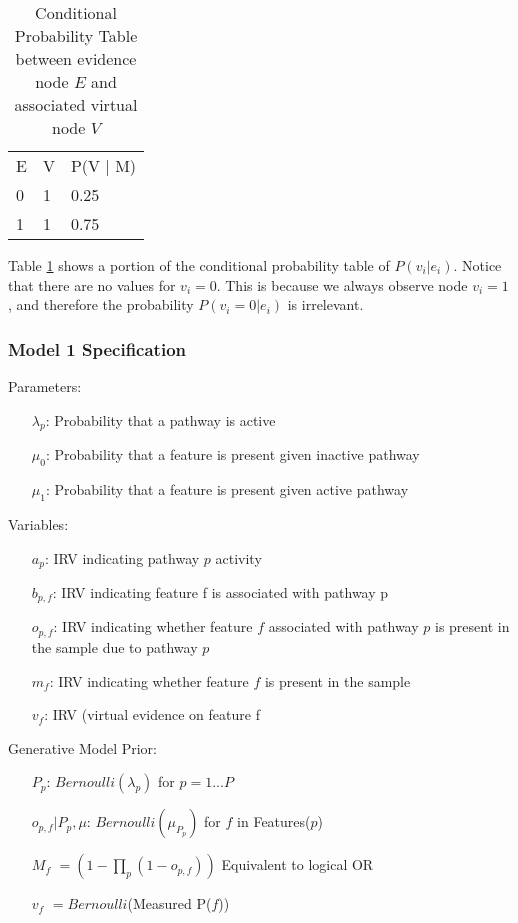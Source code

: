 \documentclass[11pt]{article}
\begin{document}
\begin{table}[]
\centering
\caption{Conditional Probability Table between evidence node $E$ and associated virtual node $V$}
\label{cpt}
\begin{tabular}{lll}
E & V & P(V | M) \\
0 & 1 & 0.25     \\
1 & 1 & 0.75    
\end{tabular}
\end{table}

Table \ref{cpt} shows a portion of the conditional probability table of $P(v_i | e_i)$. Notice that there are no values for $v_i = 0$. This is because we always observe node $v_i = 1$, and therefore the probability $P(v_i = 0 | e_i)$ is irrelevant. 

\subsubsection{Model 1 Specification}
Parameters:
\begin{itemize}
\item[$\lambda_p$:] Probability that a pathway is active
\item[$\mu_0$:] Probability that a feature is present given inactive pathway
\item[$\mu_1$:] Probability that a feature is present given active pathway
\end{itemize}

Variables:
\begin{itemize}
\item [$a_p$:] IRV indicating pathway $p$ activity
\item [$b_{p,f}$:] IRV indicating feature f is associated with pathway p
\item[$o_{p,f}$:] IRV indicating whether feature $f$ associated with pathway $p$ is present in the sample due to pathway $p$
\item[$m_f$:] IRV indicating whether feature $f$ is present in the sample
\item[$v_f$:] IRV (virtual evidence on feature f
\end{itemize}

Generative Model Prior:
\begin{itemize}
\item [$P_p$:] $Bernoulli(\lambda_p)$ for $p = 1 ... P$
\item [$o_{p,f} | P_p, \mu$:] $Bernoulli(\mu_{P_p})$ for $f$ in Features($p$)
\item [$M_f$]  $= (1 -  \prod_p (1 - o_{p,f}))$ Equivalent to logical OR
\item [$v_f$] $= Bernoulli$(Measured P($f$))
\end{itemize}
\end{document}
